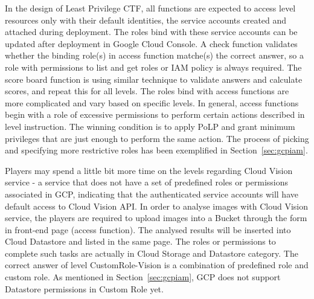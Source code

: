 In the design of Least Privilege CTF, all functions are expected to access level resources only with their default identities, the service accounts created and attached during deployment. The roles bind with these service accounts can be updated after deployment in Google Cloud Console. 
A check function validates whether the binding role(s) in access function matche(s) the correct answer, so a role with permissions to list and get roles or IAM policy is always required. The score board function is using similar technique to validate answers and calculate scores, and repeat this for all levels. The roles bind with access functions are more complicated and vary based on specific levels. In general, access functions begin with a role of excessive permissions to perform certain actions described in level instruction. The winning condition is to apply PoLP and grant minimum privileges that are just enough to perform the same action. The process of picking and specifying more restrictive roles has been exemplified in Section~\ref{sec:gcpiam}.

Players may spend a little bit more time on the levels regarding Cloud Vision service - a service that does not have a set of predefined roles or permissions associated in GCP, indicating that the authenticated service accounts will have default access to Cloud Vision API. In order to analyse images with Cloud Vision service, the players are required to upload images into a Bucket through the form in front-end page (access function). The analysed results will be inserted into Cloud Datastore and listed in the same page.  The roles or permissions to complete such tasks are actually in Cloud Storage and Datastore category. The correct answer of level CustomRole-Vision is a combination of predefined role and custom role. As mentioned in Section~\ref{sec:gcpiam}, GCP does not support Datastore permissions in Custom Role yet.
 